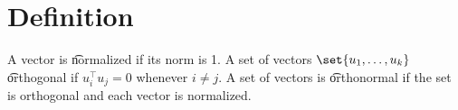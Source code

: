 
\section*{Definition}

A vector is \t{normalized} if its norm is 1.
A set of vectors $\set{u_1, \dots , u_k}$ \t{orthogonal} if $u_i^\top  u_j = 0$ whenever $i \neq j$.
A set of vectors is \t{orthonormal} if the set is orthogonal and each vector is normalized.

\blankpage